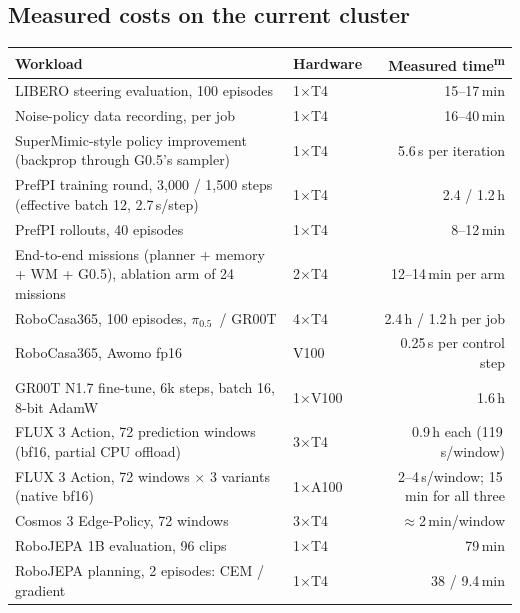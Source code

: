 \documentclass[10pt,a4paper]{article}
\newcommand{\pzf}{$\pi_{0.5}$}
\DeclareRobustCommand{\meas}{\textsuperscript{\textcolor{green!50!black}{m}}}
\begin{document}
\subsection{Measured costs on the current cluster}
\begin{small}
\begin{tabularx}{\textwidth}{Ylr}
\toprule
Workload & Hardware & Measured time\meas \\
\midrule
LIBERO steering evaluation, 100 episodes & 1$\times$T4 & 15--17\,min \\
Noise-policy data recording, per job & 1$\times$T4 & 16--40\,min \\
SuperMimic-style policy improvement (backprop through G0.5's sampler) & 1$\times$T4 & 5.6\,s per iteration \\
PrefPI training round, 3,000 / 1,500 steps (effective batch 12, 2.7\,s/step) & 1$\times$T4 & 2.4 / 1.2\,h \\
PrefPI rollouts, 40 episodes & 1$\times$T4 & 8--12\,min \\
End-to-end missions (planner + memory + WM + G0.5), ablation arm of 24 missions & 2$\times$T4 & 12--14\,min per arm \\
RoboCasa365, 100 episodes, \pzf\ / GR00T & 4$\times$T4 & 2.4\,h / 1.2\,h per job \\
RoboCasa365, Awomo fp16 & V100 & 0.25\,s per control step \\
GR00T N1.7 fine-tune, 6k steps, batch 16, 8-bit AdamW & 1$\times$V100 & 1.6\,h \\
FLUX 3 Action, 72 prediction windows (bf16, partial CPU offload) & 3$\times$T4 & 0.9\,h each (119\,s/window) \\
FLUX 3 Action, 72 windows $\times$ 3 variants (native bf16) & 1$\times$A100 & 2--4\,s/window; 15\,min for all three \\
Cosmos 3 Edge-Policy, 72 windows & 3$\times$T4 & $\approx$2\,min/window \\
RoboJEPA 1B evaluation, 96 clips & 1$\times$T4 & 79\,min \\
RoboJEPA planning, 2 episodes: CEM / gradient & 1$\times$T4 & 38 / 9.4\,min \\
\bottomrule
\end{tabularx}
\end{small}
\end{document}
